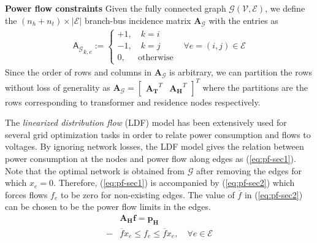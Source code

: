 \documentclass[sigconf]{acmart}
\begin{document}
\noindent\textbf{Power flow constraints}
Given the fully connected graph $\mathcal{G}(\mathcal{V},\mathcal{E})$, we define the $(n_h+n_t)\times|\mathcal{E}|$ branch-bus incidence matrix $\mathbf{A_{\mathcal{G}}}$ with the entries as
\begin{equation}
\begin{matrix}
\mathsf{A_{\mathcal{G}}}_{k,e}:=
\begin{cases}
+1,\quad k=i\\-1,\quad k=j\\0,\quad~~\textrm{otherwise}
\end{cases}
&\forall{e=(i,j)\in\mathcal{E}}
\end{matrix}
\label{eq:bus-incidence}
\end{equation}
Since the order of rows and columns in $\mathbf{A_{\mathcal{G}}}$ is arbitrary, we can partition the rows without loss of generality as $\mathbf{A_{\mathcal{G}}}=\begin{bmatrix}\mathbf{A_{T}}^T&\mathbf{A_{H}}^T\end{bmatrix}^T$ where the partitions are the rows corresponding to transformer and residence nodes respectively.

The \emph{linearized distribution flow} (LDF) model has been extensively used for several grid optimization tasks in order to relate power consumption and flows to voltages. By ignoring network losses, the LDF model gives the relation between power consumption at the nodes and power flow along edges as (\ref{eq:pf-sec1}).
Note that the optimal network is obtained from $\mathcal{G}$ after removing the edges for which $x_e=0$. Therefore, (\ref{eq:pf-sec1}) is accompanied by (\ref{eq:pf-sec2}) which forces flows $f_e$ to be zero for non-existing edges. The value of $\overline{f}$ in (\ref{eq:pf-sec2}) can be chosen to be the power flow limits in the edges.
\begin{subequations}
	\begin{align}
	&\mathbf{A_H}\mathbf{f}=\mathbf{p_H}\label{eq:pf-sec1}\\
	-&\overline{f}x_e\leq f_e\leq \overline{f}x_e,\quad \forall e\in\mathcal{E}\label{eq:pf-sec2}
	\end{align}
	\label{eq:pf-sec}
\end{subequations}
\end{document}
